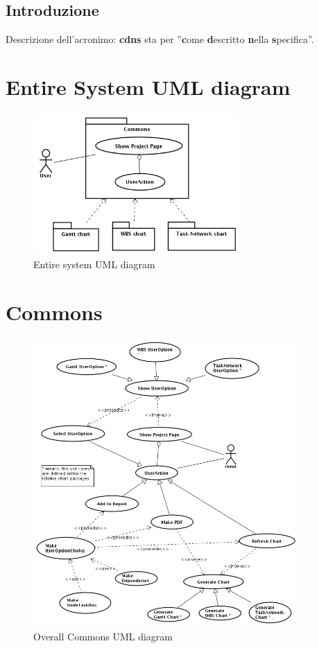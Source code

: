 \documentclass[a4paper, 12pt]{report}
\begin{document}
\tableofcontents

\newpage

\section*{Introduzione}
Descrizione dell'acronimo: \textbf{cdns} sta per ''\textbf{c}ome
\textbf{d}escritto \textbf{n}ella \textbf{s}pecifica''.

\chapter*{Entire System UML diagram}
\begin{figure}[h!] \centering
\includegraphics[width=0.7\textwidth]{EntireSystem.png} 
\caption{Entire system UML diagram}
\label{fig:entireSystemDiagram}
\end{figure}

\chapter{Commons}
\begin{figure}[h!] \centering
\includegraphics[width=0.9\textwidth]{Commons/img/Overall.png} 
\caption{Overall Commons UML diagram}
\label{fig:commonsOverallDiagram}
\end{figure}
\end{document}
